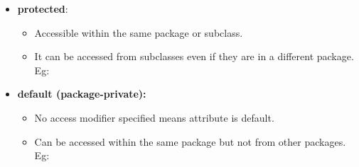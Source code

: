 \begin{flushleft}
\begin{itemize}
\begin{itemize}
		\end{itemize}
		\bigskip
		\item \textbf{protected}:
		\begin{itemize}
			\item Accessible within the same package or subclass. 
			\item It can be accessed from subclasses even if they are in a different package. Eg:
			\bigskip
		\end{itemize}
		\bigskip
		\item \textbf{default (package-private):} 
		\begin{itemize}
			\item No access modifier specified means attribute is default. 
			\item Can be accessed within the same package but not from other packages. Eg:
			\bigskip

		\end{itemize}
		

\end{itemize}
\end{flushleft}
